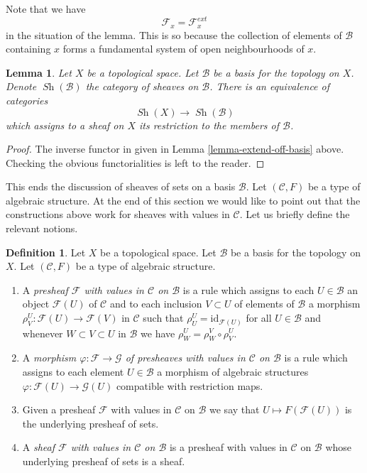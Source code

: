 \documentclass{stacks-project}
\theoremstyle{plain}
\newtheorem{lemma}[subsection]{Lemma}
\theoremstyle{definition}
\newtheorem{definition}[subsection]{Definition}
\theoremstyle{remark}
\numberwithin{equation}{subsection}
\def\Sh{\mathop{\mathit{Sh}}\nolimits}
\begin{document}
\noindent
Note that we have
$$
\mathcal{F}_x = \mathcal{F}_x^{ext}
$$
in the situation of the lemma. This is so because the
collection of elements of $\mathcal{B}$ containing
$x$ forms a fundamental system of open neighbourhoods of $x$.

\begin{lemma}
\label{lemma-restrict-basis-equivalence}
Let $X$ be a topological space.
Let $\mathcal{B}$ be a basis for the topology on $X$.
Denote $\Sh(\mathcal{B})$ the category of
sheaves on $\mathcal{B}$.
There is an equivalence of categories
$$
\Sh(X) \longrightarrow \Sh(\mathcal{B})
$$
which assigns to a sheaf on $X$ its restriction to
the members of $\mathcal{B}$.
\end{lemma}

\begin{proof}
The inverse functor in given in Lemma \ref{lemma-extend-off-basis} above.
Checking the obvious functorialities is left to the
reader.
\end{proof}

\noindent
This ends the discussion of sheaves of sets on
a basis $\mathcal{B}$. Let $(\mathcal{C}, F)$ be
a type of algebraic structure. At the end of this section
we would like to point out that the constructions
above work for sheaves with values in $\mathcal{C}$.
Let us briefly define the relevant notions.

\begin{definition}
\label{definition-sheaf-structures-basis}
Let $X$ be a topological space. Let $\mathcal{B}$ be a
basis for the topology on $X$. Let $(\mathcal{C}, F)$ be
a type of algebraic structure.
\begin{enumerate}
\item A {\it presheaf $\mathcal{F}$ with values in $\mathcal{C}$
on $\mathcal{B}$} is a rule which assigns to each
$U \in \mathcal{B}$ an object
$\mathcal{F}(U)$ of $\mathcal{C}$ and to each inclusion $V \subset U$
of elements of $\mathcal{B}$ a morphism
$\rho^U_V : \mathcal{F}(U) \to \mathcal{F}(V)$ in $\mathcal{C}$ such that
$\rho^U_U = \text{id}_{\mathcal{F}(U)}$ for all $U \in \mathcal{B}$ and
whenever $W \subset V \subset U$ in $\mathcal{B}$ we have
$\rho^U_W = \rho^V_W \circ \rho ^U_V$.
\item A {\it morphism $\varphi : \mathcal{F} \to \mathcal{G}$
of presheaves with values in $\mathcal{C}$
on $\mathcal{B}$} is a rule which assigns to each
element $U \in \mathcal{B}$ a morphism of
algebraic structures $\varphi : \mathcal{F}(U) \to \mathcal{G}(U)$
compatible with restriction maps.
\item Given a presheaf $\mathcal{F}$ with values in $\mathcal{C}$
on $\mathcal{B}$ we say that $U \mapsto F(\mathcal{F}(U))$ is the
underlying presheaf of sets.
\item A {\it sheaf $\mathcal{F}$ with values in $\mathcal{C}$
on $\mathcal{B}$} is a presheaf with values in $\mathcal{C}$
on $\mathcal{B}$ whose underlying presheaf of sets is a sheaf.
\end{enumerate}
\end{definition}
\end{document}
